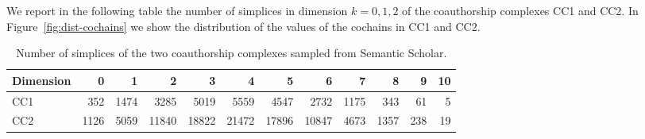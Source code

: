 We report in the following table the number of simplices in dimension $k=0,1,2$ of the coauthorship complexes CC1 and CC2. In Figure~\ref{fig:dist-cochains} we show the distribution of the values of the cochains in CC1 and CC2.
\begin{table}[htbp]
  \centering
  \scriptsize{
  \begin{tabular}{lrrrrrrrrrrr}
    \toprule
    Dimension   & 0     & 1  & 2     & 3 & 4     & 5 & 6    & 7 & 8   & 9 & 10\\
    \midrule
    CC1 & 352  & 1474  & 3285  & 5019  & 5559  & 4547  & 2732  & 1175  & 343 & 61 & 5\\
    CC2 & 1126 & 5059 & 11840 & 18822 & 21472 & 17896  & 10847 & 4673 & 1357 & 238 & 19\\
    \bottomrule
  \end{tabular}}
  \vspace{2pt}
  \caption{%
  Number of simplices of the two coauthorship complexes sampled from Semantic Scholar.
  } \label{table:Simplices-coauthor}
\end{table}

